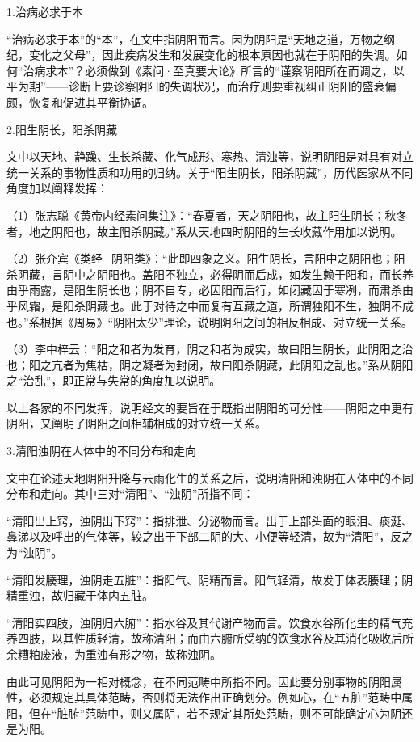 \documentclass[12pt]{ctexbook}
\begin{document}

1.治病必求于本

“治病必求于本”的“本”，在文中指阴阳而言。因为阴阳是“天地之道，万物之纲纪，变化之父母”，因此疾病发生和发展变化的根本原因也就在于阴阳的失调。如何“治病求本”？必须做到《素问·至真要大论》所言的“谨察阴阳所在而调之，以平为期”——诊断上要诊察阴阳的失调状况，而治疗则要重视纠正阴阳的盛衰偏颇，恢复和促进其平衡协调。

2.阳生阴长，阳杀阴藏

文中以天地、静躁、生长杀藏、化气成形、寒热、清浊等，说明阴阳是对具有对立统一关系的事物性质和功用的归纳。关于“阳生阴长，阳杀阴藏”，历代医家从不同角度加以阐释发挥：

（1）张志聪《黄帝内经素问集注》：“春夏者，天之阴阳也，故主阳生阴长；秋冬者，地之阴阳也，故主阳杀阴藏。”系从天地四时阴阳的生长收藏作用加以说明。

（2）张介宾《类经·阴阳类》：“此即四象之义。阳生阴长，言阳中之阴阳也；阳杀阴藏，言阴中之阴阳也。盖阳不独立，必得阴而后成，如发生赖于阳和，而长养由乎雨露，是阳生阴长也；阴不自专，必因阳而后行，如闭藏因于寒冽，而肃杀由乎风霜，是阳杀阴藏也。此于对待之中而复有互藏之道，所谓独阳不生，独阴不成也。”系根据《周易》“阴阳太少”理论，说明阴阳之间的相反相成、对立统一关系。

（3）李中梓云：“阳之和者为发育，阴之和者为成实，故曰阳生阴长，此阴阳之治也；阳之亢者为焦枯，阴之凝者为封闭，故曰阳杀阴藏，此阴阳之乱也。”系从阴阳之“治乱”，即正常与失常的角度加以说明。

以上各家的不同发挥，说明经文的要旨在于既指出阴阳的可分性——阴阳之中更有阴阳，又阐明了阴阳之间相辅相成的对立统一关系。

3.清阳浊阴在人体中的不同分布和走向

文中在论述天地阴阳升降与云雨化生的关系之后，说明清阳和浊阴在人体中的不同分布和走向。其中三对“清阳”、“浊阴”所指不同：

“清阳出上窍，浊阴出下窍”：指排泄、分泌物而言。出于上部头面的眼泪、痰涎、鼻涕以及呼出的气体等，较之出于下部二阴的大、小便等轻清，故为“清阳”，反之为“浊阴”。

“清阳发腠理，浊阴走五脏”：指阳气、阴精而言。阳气轻清，故发于体表腠理；阴精重浊，故归藏于体内五脏。

“清阳实四肢，浊阴归六腑”：指水谷及其代谢产物而言。饮食水谷所化生的精气充养四肢，以其性质轻清，故称清阳；而由六腑所受纳的饮食水谷及其消化吸收后所余糟粕废液，为重浊有形之物，故称浊阴。

由此可见阴阳为一相对概念，在不同范畴中所指不同。因此要分别事物的阴阳属性，必须规定其具体范畴，否则将无法作出正确划分。例如心，在“五脏”范畴中属阳，但在“脏腑”范畴中，则又属阴，若不规定其所处范畴，则不可能确定心为阴还是为阳。
\end{document}
